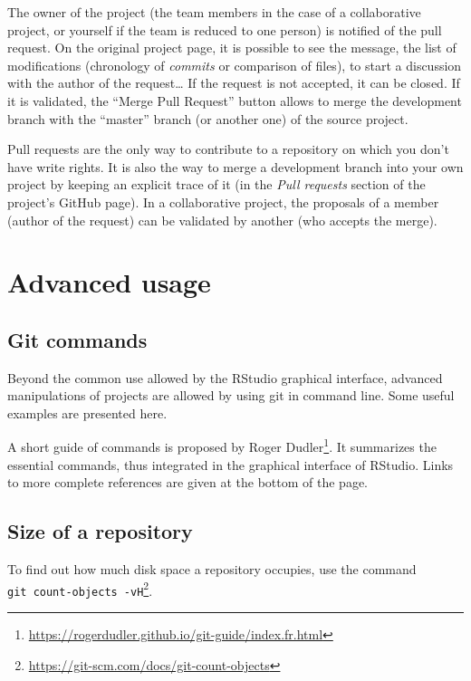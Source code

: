 \documentclass[
  12pt,
  american,
  a4paper,
  extrafontsizes,onecolumn,openright
  ]{memoir}
\newlength{\rf}
\begin{document}
The owner of the project (the team members in the case of a collaborative project, or yourself if the team is reduced to one person) is notified of the pull request.
On the original project page, it is possible to see the message, the list of modifications (chronology of \emph{commits} or comparison of files), to start a discussion with the author of the request\ldots{}
If the request is not accepted, it can be closed.
If it is validated, the \enquote{Merge Pull Request} button allows to merge the development branch with the \enquote{master} branch (or another one) of the source project.

Pull requests are the only way to contribute to a repository on which you don't have write rights.
It is also the way to merge a development branch into your own project by keeping an explicit trace of it (in the \emph{Pull requests} section of the project's GitHub page).
In a collaborative project, the proposals of a member (author of the request) can be validated by another (who accepts the merge).

\hypertarget{advanced-usage}{%
\section{Advanced usage}\label{advanced-usage}}

\hypertarget{git-commands}{%
\subsection{Git commands}\label{git-commands}}

Beyond the common use allowed by the RStudio graphical interface, advanced manipulations of projects are allowed by using git in command line.
Some useful examples are presented here.

A short guide of commands is proposed by Roger Dudler\footnote{\url{https://rogerdudler.github.io/git-guide/index.fr.html}}.
It summarizes the essential commands, thus integrated in the graphical interface of RStudio.
Links to more complete references are given at the bottom of the page.

\hypertarget{size-of-a-repository}{%
\subsection{Size of a repository}\label{size-of-a-repository}}

To find out how much disk space a repository occupies, use the command \texttt{git\ count-objects\ -vH}\footnote{\url{https://git-scm.com/docs/git-count-objects}}.
\end{document}
